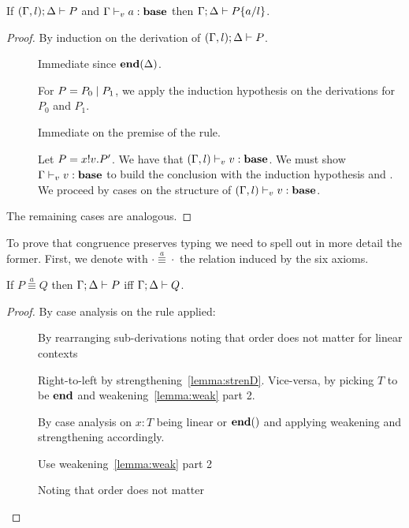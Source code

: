\begin{lemma}[Substitution]\mbox{}
  \label{le:subst}
  If $(\Gamma, l);\Delta \vdash P$ and
  ${\Gamma \vdash_v a : \mathbf{base}}$ then
  \( \Gamma;\Delta \vdash P\{a/l\} \).
\end{lemma}
\begin{proof}
  By induction on the derivation of $(\Gamma, l);\Delta \vdash P$.
  \begin{description}
  \item[] Immediate since $\mathbf{end}(\Delta)$.
    
  \item[] For $P = P_0 \mid P_1$, we apply the
    induction hypothesis on the derivations for $P_0$ and $P_1$.
    
  \item[] Immediate on the premise of the rule.
    
  \item[] Let $P = x ! v . P'$. We have that
    $(\Gamma, l) \vdash_v v : \mathbf{base}$.  We must show
    $\Gamma \vdash_v v : \mathbf{base}$ to build the conclusion with
    the induction hypothesis and . We proceed by cases
    on the structure of $(\Gamma, l) \vdash_v v : \mathbf{base}$.
  \end{description}
  The remaining cases are analogous.
  
\end{proof}

\newcommand{\sconga}[2]{#1 \stackrel{a}{\equiv} #2}
To prove that congruence preserves typing we need to spell out in more detail the former. First, we denote with $\sconga\cdot\cdot$ the relation induced by the six axioms.

\begin{lemma}
  \label{le:presequiva}
  If \( \sconga{P}{Q} \) then \( \Gamma;\Delta \vdash P \)  iff \( \Gamma;\Delta \vdash Q \).
\end{lemma}
\begin{proof}
  By case analysis on the  rule applied:
  \begin{description}
  \item[] By rearranging sub-derivations noting that
    order does not matter for linear contexts
  \item[]
   Right-to-left by strengthening~\ref{lemma:strenD}. Vice-versa,
    by picking $T$ to be $\mathbf{end}$ and weakening~\ref{lemma:weak} part 2.
  \item[] By case analysis on $x : T$ being linear or $\tend$ and applying weakening and strengthening accordingly.
  \item[] Use weakening~\ref{lemma:weak} part 2
  \item[] Noting that order does not matter
  \end{description}
\end{proof}

